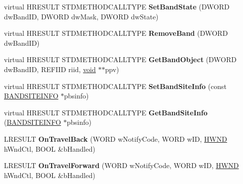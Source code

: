 \begin{DoxyCompactItemize}
virtual H\+R\+E\+S\+U\+LT S\+T\+D\+M\+E\+T\+H\+O\+D\+C\+A\+L\+L\+T\+Y\+PE {\bfseries Set\+Band\+State} (D\+W\+O\+RD dw\+Band\+ID, D\+W\+O\+RD dw\+Mask, D\+W\+O\+RD dw\+State)
\item 
\mbox{\label{class_c_internet_toolbar_af764efc92063fabaafeb15980014ad98}} 
virtual H\+R\+E\+S\+U\+LT S\+T\+D\+M\+E\+T\+H\+O\+D\+C\+A\+L\+L\+T\+Y\+PE {\bfseries Remove\+Band} (D\+W\+O\+RD dw\+Band\+ID)
\item 
\mbox{\label{class_c_internet_toolbar_a688b28439868b4abacb682b3468521c0}} 
virtual H\+R\+E\+S\+U\+LT S\+T\+D\+M\+E\+T\+H\+O\+D\+C\+A\+L\+L\+T\+Y\+PE {\bfseries Get\+Band\+Object} (D\+W\+O\+RD dw\+Band\+ID, R\+E\+F\+I\+ID riid, \hyperlink{interfacevoid}{void} $\ast$$\ast$ppv)
\item 
\mbox{\label{class_c_internet_toolbar_a79e12bdd7fe35ea6c4e9c6b9aedcf330}} 
virtual H\+R\+E\+S\+U\+LT S\+T\+D\+M\+E\+T\+H\+O\+D\+C\+A\+L\+L\+T\+Y\+PE {\bfseries Set\+Band\+Site\+Info} (const \hyperlink{structtag_b_a_n_d_s_i_t_e_i_n_f_o}{B\+A\+N\+D\+S\+I\+T\+E\+I\+N\+FO} $\ast$pbsinfo)
\item 
\mbox{\label{class_c_internet_toolbar_a2d717d2670655bd0c7c508226a30d70f}} 
virtual H\+R\+E\+S\+U\+LT S\+T\+D\+M\+E\+T\+H\+O\+D\+C\+A\+L\+L\+T\+Y\+PE {\bfseries Get\+Band\+Site\+Info} (\hyperlink{structtag_b_a_n_d_s_i_t_e_i_n_f_o}{B\+A\+N\+D\+S\+I\+T\+E\+I\+N\+FO} $\ast$pbsinfo)
\item 
\mbox{\label{class_c_internet_toolbar_a8bb520c5a1feacb72fb955660f283a83}} 
L\+R\+E\+S\+U\+LT {\bfseries On\+Travel\+Back} (W\+O\+RD w\+Notify\+Code, W\+O\+RD w\+ID, \hyperlink{interfacevoid}{H\+W\+ND} h\+Wnd\+Ctl, B\+O\+OL \&b\+Handled)
\item 
\mbox{\label{class_c_internet_toolbar_af104b1f75731fe1540b3237d792900d2}} 
L\+R\+E\+S\+U\+LT {\bfseries On\+Travel\+Forward} (W\+O\+RD w\+Notify\+Code, W\+O\+RD w\+ID, \hyperlink{interfacevoid}{H\+W\+ND} h\+Wnd\+Ctl, B\+O\+OL \&b\+Handled)
\item 
\mbox{\label{class_c_internet_toolbar_ab57a07f426f9cb3a57b5d7bab66b8694}} 
$$
\end{DoxyCompactItemize}
